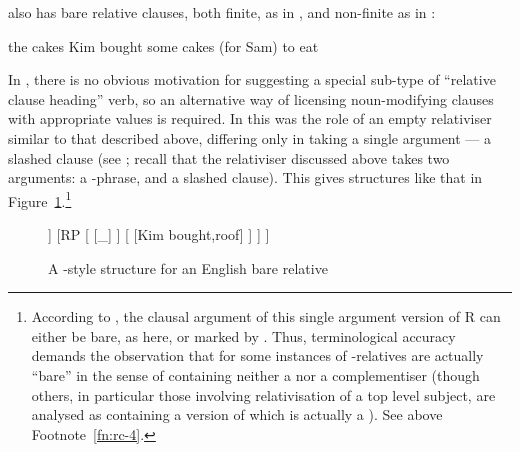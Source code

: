 \documentclass[output=paper
 	        ,biblatex
                ,babelshorthands
                ,newtxmath
                ,draftmode
                ,colorlinks, citecolor=brown
]{langscibook}
\begin{document}
 also has bare relative clauses, both finite, as in , and non-finite
as in :
\begin{exe}\ex\begin{xlist}\label{x:rc-88}
  \ex\label{x:rc-89} the cakes Kim bought \trace
  \ex\label{x:rc-90} some cakes (for Sam) to eat \trace
\end{xlist}\end{exe}
In , there is no obvious motivation for suggesting a special sub-type of ``relative
clause heading'' verb, so an alternative way of licensing noun-modifying clauses with
appropriate  values is required. In \cite{Pollard:Sag:94} this was the role
of an empty relativiser similar to that described above, differing only in taking a single
argument --- a slashed clause (see \citealt[222]{Pollard:Sag:94}; recall that the
relativiser discussed above takes two arguments: a -phrase, and a slashed
clause). This gives structures like that in Figure~\ref{fig:rc-7}.\footnote{According to
  \cite[222]{Pollard:Sag:94}, the clausal argument of this single argument version of R
  can either be bare, as here, or marked by . Thus, terminological accuracy
  demands the observation that for \citeauthor{Pollard:Sag:94} some instances of
  -relatives are actually ``bare'' in the sense of containing neither a  nor a complementiser (though others, in particular those involving
  relativisation of a top level subject, are analysed as containing a version of
   which is actually a ). See above Footnote~\ref{fn:rc-4}.}
\begin{figure}
	\begin{forest}  %
	[\ibar{N}$_{\ibox{1}}$ , baseline
		[\ibox{7}\ibar{N}$_{\ibox{1}}$
			[cakes]
		]
		[RP 
			[%
				[\_]
			]
            [
            	[Kim bought,roof]
            ]
		]
   ]
   \end{forest}
   \caption{A \cite{Pollard:Sag:94}-style structure for an English bare relative}
   \label{fig:rc-7}
\end{figure}
\end{document}
